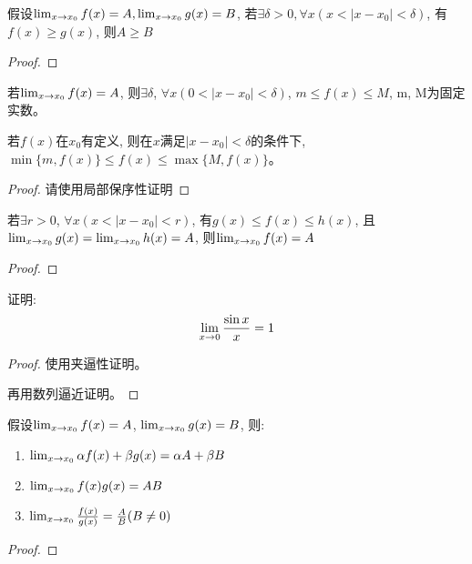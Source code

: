 \documentclass[lang=cn]{elegantbook}
\begin{document}
\begin{lemma}
    假设$\lim_{x \to x_0 } f(x) = A, \lim_{x \to x_0 } g(x) = B$, 若$\exists \delta > 0, \forall x (x < \left| x - x_0\right| < \delta)$, 有$f(x) \ge g(x)$, 则$A \ge B$
\end{lemma}
\begin{proof}

\end{proof}


\begin{theorem}[函数极限的局部有界性]
    若$\lim_{x \to x_0 } f(x) = A$, 则$\exists \delta$, $\forall x(0 < \left| x - x_0 \right| < \delta)$, $m \le f(x) \le M$, m, M为固定实数。

    若$f(x)$在$x_0$有定义, 则在$x$满足$\left| x - x_0 \right| < \delta$的条件下, $\min\{m, f(x)\} \le f(x) \le \max\{M, f(x)\}$。
\end{theorem}
\begin{proof}
    请使用局部保序性证明
\end{proof}

\begin{theorem}[函数极限的夹逼性定理]
    若$\exists r > 0$, $\forall x(x < \left| x - x_0 \right| < r)$, 有$g(x) \le f(x) \le h(x)$, 且$\lim_{x \to x_0 } g(x) = \lim_{x \to x_0 } h(x) = A$, 则$\lim_{x \to x_0 } f(x) = A$
\end{theorem}
\begin{proof}
    
\end{proof}

\begin{proposition}
    证明: 
    \[ \lim_{x \to 0 } \frac{\sin x}{x} = 1 \]
\end{proposition}
\begin{proof}
    使用夹逼性证明。

    再用数列逼近证明。
\end{proof}

\begin{theorem}[函数极限四则运算]
    假设$\lim_{x \to x_0 } f(x) = A$, $\lim_{x \to x_0 } g(x) = B$, 则: 
    \begin{enumerate}
        \item $\lim_{x \to x_0 } \alpha f(x) + \beta g(x) = \alpha A + \beta B$
        \item $\lim_{x \to x_0 } f(x)g(x) = AB$
        \item $\lim_{x \to x_0 } \frac{f(x)}{g(x)} = \frac{A}{B}(B \neq 0)$
    \end{enumerate}
\end{theorem}
\begin{proof}
    
\end{proof}
\end{document}
